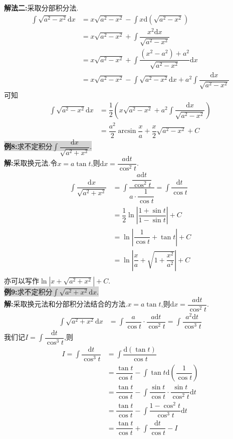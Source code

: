 \documentclass[a4paper,oneside]{ctexart}
\newcommand{\di}{\mathrm{d}}
\begin{document}
\textbf{解法二:}采取分部积分法.
$$\begin{aligned}
  \int{\sqrt{a^2-x^2}\di x} &= x\sqrt{a^2-x^2}-\int{x\di\left(\sqrt{a^2-x^2}\right)} \\
                            &= x\sqrt{a^2-x^2}+\int{\dfrac{x^2\di x}{\sqrt{a^2-x^2}}} \\
                            &= x\sqrt{a^2-x^2}+\int{\dfrac{(x^2-a^2)+a^2}{\sqrt{a^2-x^2}}\di x} \\
                            &= x\sqrt{a^2-x^2}-\int{\sqrt{a^2-x^2}\di x}+a^2\int{\dfrac{\di x}{\sqrt{a^2-x^2}}}
\end{aligned}$$
可知
$$\begin{aligned}
  \int{\sqrt{a^2-x^2}\di x} &= \dfrac{1}{2}\left( x\sqrt{a^2-x^2}+a^2\int{\dfrac{\di x}{\sqrt{a^2-x^2}}}\right) \\
                            &= \dfrac{a^2}{2}\arcsin{\dfrac{x}{a}}+\dfrac{x}{2}\sqrt{a^2-x^2}+C
\end{aligned}$$
\colorbox{lightgray}{\textbf{例8:}求不定积分$\int{\dfrac{\di x}{\sqrt{a^2+x^2}}}$.}\\
\textbf{解:}采取换元法.令$x=a\tan{t}$,则$\di x=\dfrac{a\di t}{\cos^2{t}}$.
$$\begin{aligned}
  \int{\dfrac{\di x}{\sqrt{a^2+x^2}}} &= \int{\dfrac{\dfrac{a\di t}{\cos^2{t}}}{a\cdot\dfrac{1}{\cos{t}}}} = \int{\dfrac{\di t}{\cos{t}}} \\
                                      &= \dfrac{1}{2}\ln\left\lvert\dfrac{1+\sin{t}}{1-\sin{t}}\right\rvert+C \\
                                      &= \ln{\left\lvert\dfrac{1}{\cos{t}}+\tan{t}\right\rvert}+C \\
                                      &= \ln{\left\lvert\dfrac{x}{a}+\sqrt{1+\dfrac{x^2}{a^2}}\right\rvert}+C \\
\end{aligned}$$
亦可以写作$\ln{\left\lvert x+\sqrt{a^2+x^2}\right\rvert}+C$.\\
\colorbox{lightgray}{\textbf{例9:}求不定积分$\int{\sqrt{a^2+x^2}\di x}$.}\\
\textbf{解:}采取换元法和分部积分法结合的方法.$x=a\tan{t}$,则$\di x=\dfrac{a\di t}{\cos^2{t}}$.
$$\begin{aligned}
  \int{\sqrt{a^2+x^2}\di x} &= \int \dfrac{a}{\cos{t}}\cdot\dfrac{a\di t}{\cos^2{t}} = \int{\dfrac{a^2\di t}{\cos^3{t}}} 
\end{aligned}$$
我们记$I=\int{\dfrac{\di t}{\cos^3{t}}}$,则
$$\begin{aligned}
  I = \int{\dfrac{\di t}{\cos^3{t}}} &= \int{\dfrac{\di\left(\tan{t}\right)}{\cos{t}}} \\
                                     &= \dfrac{\tan{t}}{\cos{t}}-\int{\tan{t}\di\left(\dfrac{1}{\cos{t}}\right)} \\
                                     &= \dfrac{\tan{t}}{\cos{t}}-\int{\dfrac{\sin{t}}{\cos{t}}\cdot\dfrac{\sin{t}}{\cos^2{t}}\di t} \\
                                     &= \dfrac{\tan{t}}{\cos{t}}-\int{\dfrac{1-\cos^2{t}}{\cos^3{t}}\di t}\\
                                     &= \dfrac{\tan{t}}{\cos{t}}+\int{\dfrac{\di t}{\cos{t}}}-I
\end{aligned}$$
\end{document}
